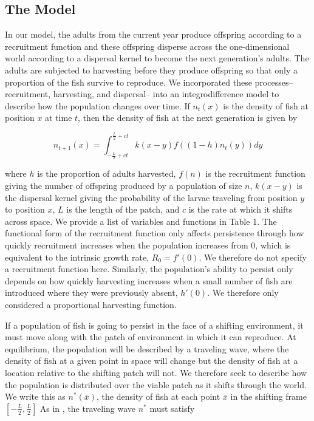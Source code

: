 \documentclass[]{article}
\begin{document}
\subsection{The Model }

In our model, the adults from the current year produce offspring according to a recruitment function and these 
offspring disperse across the one-dimensional world according to a dispersal kernel to become the next 
generation's adults. The adults are subjected to harvesting before they produce offspring so that only a 
proportion of the fish survive to reproduce. We incorporated these processes-- recruitment, harvesting, and 
dispersal-- into an integrodifference model to describe how the population changes over time. If $n_t(x)$ 
is the density of fish at position $x$ at time $t$, then the density of fish at the next generation is given by

\begin{equation}
n_{t+1}(x)=\int^{\frac{L}{2}+ct}_{-\frac{L}{2}+ct}k(x-y)f((1-h)n_t(y))dy \label{integrodifference}
\end{equation}

\noindent where $h$ is the proportion of adults harvested, $f(n)$ is the recruitment function giving the number of 
offspring produced by a population of size $n$, $k(x-y)$ is the dispersal kernel giving the probability of the 
larvae traveling from position $y$ to position $x$, $L$ is the length of the patch, and $c$ is the rate at which it 
shifts across space. We provide a list of variables and functions in Table 1. The functional form of the 
recruitment function only affects persistence through how quickly recruitment increases when the population 
increases from $0$, which is equivalent to the intrinsic growth rate, $R_0=f'(0)$. We therefore do not specify a 
recruitment function here. Similarly, the population's ability to persist only depends on how quickly harvesting 
increases when a small number of fish are introduced where they were previously absent, $h'(0)$. We 
therefore only considered a proportional harvesting function.

If a population of fish is going to persist in the face of a shifting environment, it must move along with the patch 
of environment in which it can reproduce. At equilibrium, the population will be described by a traveling wave, 
where the density of fish at a given point in space will change but the density of fish at a location relative to the 
shifting  patch will not. We therefore seek to describe how the population is distributed over the viable 
patch as it shifts through the world. We write this as $n^*(\bar{x})$, the density of fish at each point $\bar{x}$ in 
the shifting frame $\left[-\frac{L}{2}, \frac{L}{2}\right]$ As in \citet{ZhouKot2011}, the traveling wave $n^*$ must 
satisfy
\end{document}
